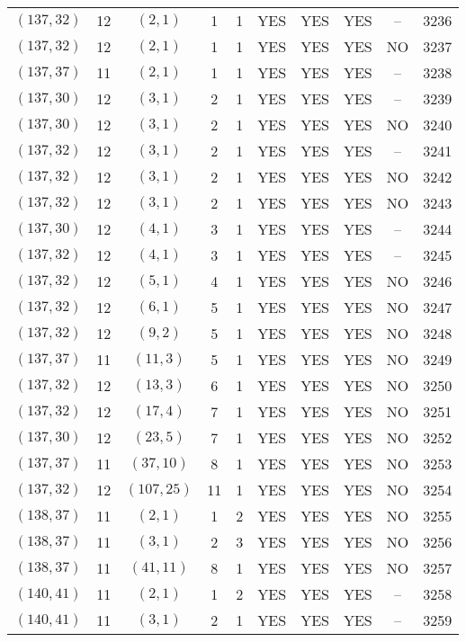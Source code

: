 \begin{longtable}{|c|c|c|c|c|c|c|c|c|c|}
$(137, 32)$ & 12 & $(2, 1)$ & 1 & 1 & YES & YES & YES & -- & 3236\\
$(137, 32)$ & 12 & $(2, 1)$ & 1 & 1 & YES & YES & YES & NO & 3237\\
$(137, 37)$ & 11 & $(2, 1)$ & 1 & 1 & YES & YES & YES & -- & 3238\\
$(137, 30)$ & 12 & $(3, 1)$ & 2 & 1 & YES & YES & YES & -- & 3239\\
$(137, 30)$ & 12 & $(3, 1)$ & 2 & 1 & YES & YES & YES & NO & 3240\\
$(137, 32)$ & 12 & $(3, 1)$ & 2 & 1 & YES & YES & YES & -- & 3241\\
$(137, 32)$ & 12 & $(3, 1)$ & 2 & 1 & YES & YES & YES & NO & 3242\\
$(137, 32)$ & 12 & $(3, 1)$ & 2 & 1 & YES & YES & YES & NO & 3243\\
$(137, 30)$ & 12 & $(4, 1)$ & 3 & 1 & YES & YES & YES & -- & 3244\\
$(137, 32)$ & 12 & $(4, 1)$ & 3 & 1 & YES & YES & YES & -- & 3245\\
$(137, 32)$ & 12 & $(5, 1)$ & 4 & 1 & YES & YES & YES & NO & 3246\\
$(137, 32)$ & 12 & $(6, 1)$ & 5 & 1 & YES & YES & YES & NO & 3247\\
$(137, 32)$ & 12 & $(9, 2)$ & 5 & 1 & YES & YES & YES & NO & 3248\\
$(137, 37)$ & 11 & $(11, 3)$ & 5 & 1 & YES & YES & YES & NO & 3249\\
$(137, 32)$ & 12 & $(13, 3)$ & 6 & 1 & YES & YES & YES & NO & 3250\\
$(137, 32)$ & 12 & $(17, 4)$ & 7 & 1 & YES & YES & YES & NO & 3251\\
$(137, 30)$ & 12 & $(23, 5)$ & 7 & 1 & YES & YES & YES & NO & 3252\\
$(137, 37)$ & 11 & $(37, 10)$ & 8 & 1 & YES & YES & YES & NO & 3253\\
$(137, 32)$ & 12 & $(107, 25)$ & 11 & 1 & YES & YES & YES & NO & 3254\\
$(138, 37)$ & 11 & $(2, 1)$ & 1 & 2 & YES & YES & YES & NO & 3255\\
$(138, 37)$ & 11 & $(3, 1)$ & 2 & 3 & YES & YES & YES & NO & 3256\\
$(138, 37)$ & 11 & $(41, 11)$ & 8 & 1 & YES & YES & YES & NO & 3257\\
$(140, 41)$ & 11 & $(2, 1)$ & 1 & 2 & YES & YES & YES & -- & 3258\\
$(140, 41)$ & 11 & $(3, 1)$ & 2 & 1 & YES & YES & YES & -- & 3259\\

\end{longtable}
